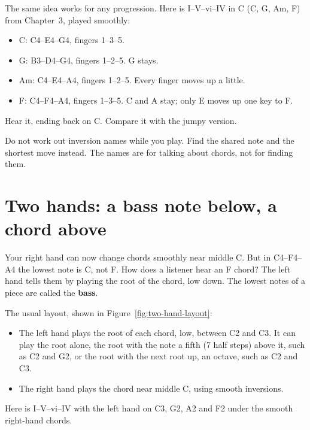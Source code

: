 The same idea works for any progression. Here is I--V--vi--IV in C (C, G, Am, F) from Chapter~3, played smoothly:
\begin{itemize}
  \item C: C4--E4--G4, fingers 1--3--5.
  \item G: B3--D4--G4, fingers 1--2--5. G stays.
  \item Am: C4--E4--A4, fingers 1--2--5. Every finger moves up a little.
  \item F: C4--F4--A4, fingers 1--3--5. C and A stay; only E moves up one key to F.
\end{itemize}
Hear it, ending back on C.  Compare it with the jumpy version. 

\begin{trapbox}
Do not work out inversion names while you play. Find the shared note and the shortest move instead. The names are for talking about chords, not for finding them.
\end{trapbox}

\section{Two hands: a bass note below, a chord above}

Your right hand can now change chords smoothly near middle C. But in C4--F4--A4 the lowest note is C, not F. How does a listener hear an F chord? The left hand tells them by playing the root of the chord, low down. The lowest notes of a piece are called the \textbf{bass}.

The usual layout, shown in Figure~\ref{fig:two-hand-layout}:
\begin{itemize}
  \item The left hand plays the root of each chord, low, between C2 and C3. It can play the root alone, the root with the note a fifth (7 half steps) above it, such as C2 and G2, or the root with the next root up, an octave, such as C2 and C3.
  \item The right hand plays the chord near middle C, using smooth inversions.
\end{itemize}

Here is I--V--vi--IV with the left hand on C3, G2, A2 and F2 under the smooth right-hand chords. 

